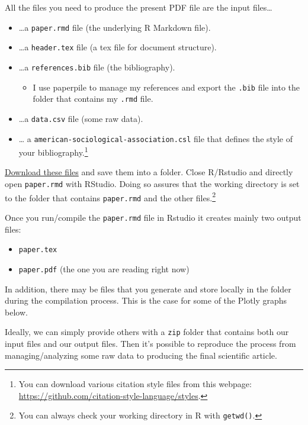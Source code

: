 \documentclass[
  12pt,
]{article}
\providecommand{\tightlist}{%
  \setlength{\itemsep}{0pt}\setlength{\parskip}{0pt}}
\begin{document}
All the files you need to produce the present PDF file are the input files\ldots{}

\begin{itemize}
\tightlist
\item
  \ldots a \texttt{paper.rmd} file (the underlying R Markdown file).
\item
  \ldots a \texttt{header.tex} file (a tex file for document structure).
\item
  \ldots a \texttt{references.bib} file (the bibliography).

  \begin{itemize}
  \tightlist
  \item
    I use paperpile to manage my references and export the \texttt{.bib} file into the folder that contains my \texttt{.rmd} file.
  \end{itemize}
\item
  \ldots a \texttt{data.csv} file (some raw data).
\item
  \ldots{} a \texttt{american-sociological-association.csl} file that defines the style of your bibliography.\footnote{You can download various citation style files from this webpage: \url{https://github.com/citation-style-language/styles}.}
\end{itemize}

\href{https://drive.google.com/drive/folders/1zJP3cNPrHN-gj0rcmbHQgg-XA0hqDXdd?usp=sharing}{Download these files} and save them into a folder. Close R/Rstudio and directly open \texttt{paper.rmd} with RStudio. Doing so assures that the working directory is set to the folder that contains \texttt{paper.rmd} and the other files.\footnote{You can always check your working directory in R with \texttt{getwd()}.}

Once you run/compile the \texttt{paper.rmd} file in Rstudio it creates mainly two output files:

\begin{itemize}
\tightlist
\item
  \texttt{paper.tex}
\item
  \texttt{paper.pdf} (the one you are reading right now)
\end{itemize}

In addition, there may be files that you generate and store locally in the folder during the compilation process. This is the case for some of the Plotly graphs below.

Ideally, we can simply provide others with a \texttt{zip} folder that contains both our input files and our output files. Then it's possible to reproduce the process from managing/analyzing some raw data to producing the final scientific article.
\end{document}
